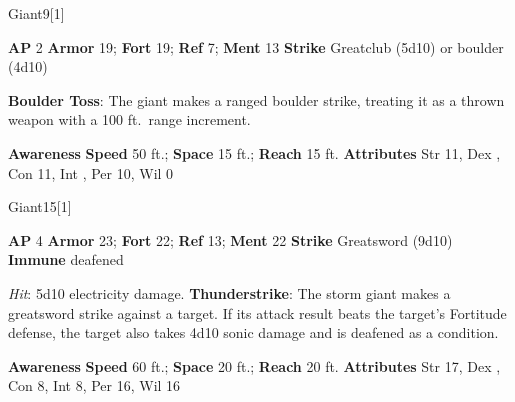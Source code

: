 \begin{monsection}[Stone]{Giant}{9}[1]
\vspace{-1em}\vspace{-1em}
\begin{spellcontent}
\begin{spelltargetinginfo}
{\textbf{AP} 2}
\pari \textbf{Armor} 19;
\textbf{Fort} 19;
\textbf{Ref} 7;
\textbf{Ment} 13
\pari \textbf{Strike} Greatclub  (5d10) or boulder  (4d10)
\end{spelltargetinginfo}
\begin{spelleffects}
\pari
\textbf{Boulder Toss}:
The giant makes a ranged boulder strike, treating it as a thrown weapon with a 100 ft.\ range increment.
\end{spelleffects}
\end{spellcontent}
\begin{spellsubcontent}
\begin{spellfooter}
\pari \textbf{Awareness} 
\pari \textbf{Speed} 50 ft.;
\textbf{Space} 15 ft.;
\textbf{Reach} 15 ft.
\pari \textbf{Attributes}
Str 11,
Dex ,
Con 11,
Int ,
Per 10,
Wil 0
\end{spellfooter}
\end{spellsubcontent}
\end{monsection}
\begin{monsection}[Storm]{Giant}{15}[1]
\vspace{-1em}\vspace{-1em}
\begin{spellcontent}
\begin{spelltargetinginfo}
{\textbf{AP} 4}
\pari \textbf{Armor} 23;
\textbf{Fort} 22;
\textbf{Ref} 13;
\textbf{Ment} 22
\pari \textbf{Strike} Greatsword  (9d10)
\pari \textbf{Immune} deafened
\end{spelltargetinginfo}
\begin{spelleffects}
\pari
{}
\par
\par \textit{Hit}: 5d10 electricity damage.
\vspace{0.5em}
\pari
\textbf{Thunderstrike}:
The storm giant makes a greatsword strike against a target.
If its attack result beats the target's Fortitude defense,
the target also takes 4d10 sonic damage
and is deafened as a condition.
\end{spelleffects}
\end{spellcontent}
\begin{spellsubcontent}
\begin{spellfooter}
\pari \textbf{Awareness} 
\pari \textbf{Speed} 60 ft.;
\textbf{Space} 20 ft.;
\textbf{Reach} 20 ft.
\pari \textbf{Attributes}
Str 17,
Dex ,
Con 8,
Int 8,
Per 16,
Wil 16
\end{spellfooter}
\end{spellsubcontent}
\end{monsection}
